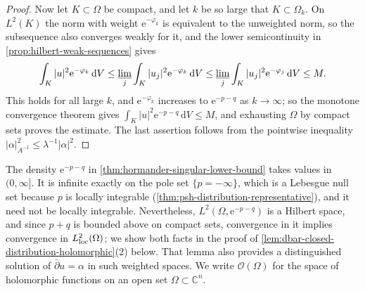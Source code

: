 \begin{proof}
Now let $K\subset\Omega$ be compact, and let $k$ be so large that $K\subset\Omega_k$. On $L^2(K)$ the norm with weight $\mathrm e^{-\varphi_k}$ is equivalent to the unweighted norm, so the subsequence also converges weakly for it, and the lower semicontinuity in \cref{prop:hilbert-weak-sequences} gives
\[
 \int_K|u|^2\mathrm e^{-\varphi_k}\,\mathrm dV\le\varliminf_j\int_K|u_j|^2\mathrm e^{-\varphi_k}\,\mathrm dV\le\varliminf_j\int_K|u_j|^2\mathrm e^{-\varphi_j}\,\mathrm dV\le M.
\]
This holds for all large $k$, and $\mathrm e^{-\varphi_k}$ increases to $\mathrm e^{-p-q}$ as $k\to\infty$; so the monotone convergence theorem gives $\int_K|u|^2\mathrm e^{-p-q}\,\mathrm dV\le M$, and exhausting $\Omega$ by compact sets proves the estimate. The last assertion follows from the pointwise inequality $|\alpha|_{A^{-1}}^2\le\lambda^{-1}|\alpha|^2$.
\end{proof}

The density $\mathrm e^{-p-q}$ in \cref{thm:hormander-singular-lower-bound} takes values in $(0,\infty]$. It is infinite exactly on the pole set $\{p=-\infty\}$, which is a Lebesgue null set because $p$ is locally integrable (\cref{thm:psh-distribution-representative}), and it need not be locally integrable. Nevertheless, $L^2(\Omega,\mathrm e^{-p-q})$ is a Hilbert space, and since $p+q$ is bounded above on compact sets, convergence in it implies convergence in $L^2_{\mathrm{loc}}(\Omega)$; we show both facts in the proof of \cref{lem:dbar-closed-distribution-holomorphic}(2) below. That lemma also provides a distinguished solution of $\bar\partial u=\alpha$ in such weighted spaces. We write $\mathcal O(\Omega)$ for the space of holomorphic functions on an open set $\Omega\subset\mathbb C^n$.

